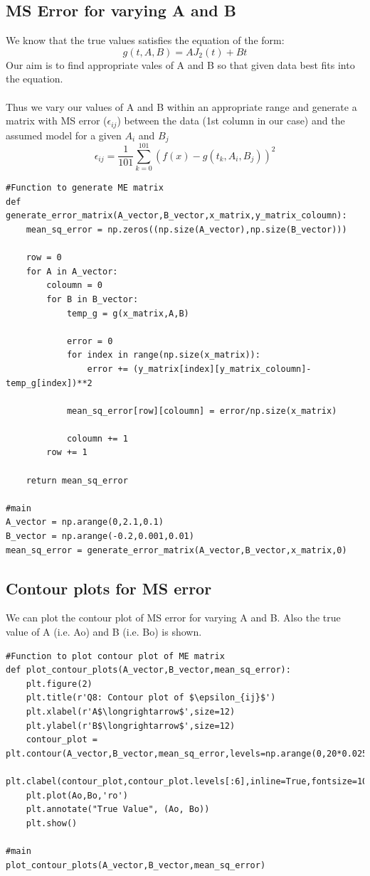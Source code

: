 \documentclass[11pt, a4paper]{article}
\begin{document}
\subsection{MS Error for varying A and B}
We know that the true values satisfies the equation of the form:\\
\begin{equation*}
g(t,A,B) = AJ_{2}(t)+Bt 
\end{equation*}
Our aim is to find appropriate vales of A and B so that given data best fits into the equation.\\\\Thus we vary our values of A and B within an appropriate range and generate a matrix with MS error ($\epsilon_{ij}$) between the data (1st column in our case) and the assumed model for a given $A_i$ and $B_j$
\begin{equation}
    \epsilon_{ij} =  \frac{1}{101}\sum_{k=0}^{101}(f(x)-g(t_k,A_i,B_j))^2
\end{equation}
\begin{lstlisting}
#Function to generate ME matrix
def generate_error_matrix(A_vector,B_vector,x_matrix,y_matrix_coloumn):
	mean_sq_error = np.zeros((np.size(A_vector),np.size(B_vector)))

	row = 0
	for A in A_vector:
		coloumn = 0
		for B in B_vector:
			temp_g = g(x_matrix,A,B)

			error = 0
			for index in range(np.size(x_matrix)):
				error += (y_matrix[index][y_matrix_coloumn]-temp_g[index])**2

			mean_sq_error[row][coloumn] = error/np.size(x_matrix)

			coloumn += 1
		row += 1

	return mean_sq_error

#main
A_vector = np.arange(0,2.1,0.1)
B_vector = np.arange(-0.2,0.001,0.01)
mean_sq_error = generate_error_matrix(A_vector,B_vector,x_matrix,0)
\end{lstlisting}

\subsection{Contour plots for MS error}
\par We can plot the contour plot of MS error for varying A and B. Also the true value of A (i.e. Ao) and B (i.e. Bo) is shown.
\begin{lstlisting}
#Function to plot contour plot of ME matrix
def plot_contour_plots(A_vector,B_vector,mean_sq_error):
	plt.figure(2)
	plt.title(r'Q8: Contour plot of $\epsilon_{ij}$')
	plt.xlabel(r'A$\longrightarrow$',size=12)
	plt.ylabel(r'B$\longrightarrow$',size=12)
	contour_plot = plt.contour(A_vector,B_vector,mean_sq_error,levels=np.arange(0,20*0.025,0.025))
	plt.clabel(contour_plot,contour_plot.levels[:6],inline=True,fontsize=10)
	plt.plot(Ao,Bo,'ro')
	plt.annotate("True Value", (Ao, Bo))
	plt.show()

#main
plot_contour_plots(A_vector,B_vector,mean_sq_error)
\end{lstlisting}
\end{document}
